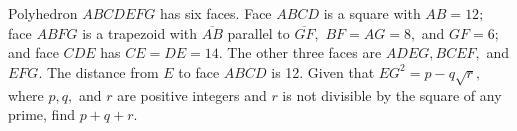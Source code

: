 Polyhedron $ABCDEFG$ has six faces.  Face $ABCD$ is a square with $AB=12;$ face $ABFG$ is a trapezoid with $\overline{AB}$ parallel to $\overline{GF},$ $BF=AG=8,$ and $GF=6;$ and face $CDE$ has $CE=DE=14.$  The other three faces are $ADEG, BCEF,$ and $EFG.$  The distance from $E$ to face $ABCD$ is 12.  Given that $EG^2=p-q\sqrt{r},$ where $p, q,$ and $r$ are positive integers and $r$ is not divisible by the square of any prime, find $p+q+r.$